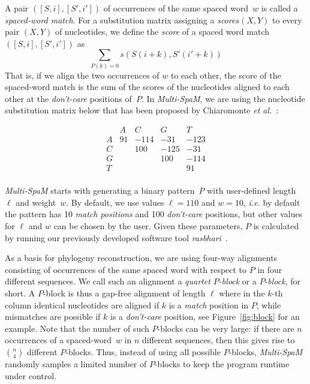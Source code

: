 \documentclass[review]{elsarticle}
\begin{document}
{A pair $\left([S,i],[S',i']\right)$ of occurrences of the same spaced word~$w$ is called a {\em spaced-word match}. For a substitution matrix assigning a {\em score}$s( X,Y)$ to every pair $(X,Y)$ of nucleotides, we define the {\em score} of a spaced word match $([S,i],[S',i'])$ as  
$$\sum_{P(k) = 0}  s( S(i+k),S'(i'+k))$$
That is, if we align the two occurrences of $w$ to each other, the score of the spaced-word match is the sum of the scores of the nucleotides aligned to each other at the {\em don't-care} positions of~$P$. In {\em Multi-SpaM}, we are using the  nucleotide substitution matrix below that has been proposed by
Chiaromonte {\em et al.}~\cite{chi:yap:mil:02}:

\[
\begin{array}{crrrr}
  & A  &   C  &  G  &   T  \\
A & 91 & -114 & -31 & -123 \\
C &    & 100  &-125 &  -31 \\
G &    &      & 100 & -114 \\
T &    &      &     &   91 \\
\end{array}
\]

{\em Multi-SpaM} starts with generating a binary pattern~$P$ with  user-defined length~$\ell$ and weight~$w$. By default, we use values $\ell=110$ and $w=10$, {\em i.e.} by default the pattern has 10 {\em match positions} and 100 {\em don't-care} positions, but other values for $\ell$ and $w$ can be chosen by the user. Given these parameters, $P$ is calculated by running our previously developed software tool {\em rasbhari}~\cite{hah:lei:oun:etal:16}.  

As a basis for phylogeny reconstruction, we are using four-way alignments consisting of occurrences of the same spaced word with respect to $P$ in four different sequences. We call such an alignment a {\em quartet $P$-block} or a $P$-{\em block}, for short. A $P$-block is thus a gap-free alignment of length $\ell$ where in the $k$-th column identical nucleotides are aligned if $k$ is a {\em  match} position in $P$, while mismatches are possible if $k$ is a {\em don't-care} position, see Figure~\ref{fig:block} for an example.   
%
%
%
Note that the number of such $P$-blocks can be very large: if there are $n$ occurrences of a spaced-word~$w$ in $n$ different sequences, then this gives rise to $n \choose 4$ different $P$-blocks. 
Thus, instead of using all possible $P$-blocks, {\em Multi-SpaM} randomly samples a limited number of $P$-blocks  to keep the program runtime under control.  

}
\end{document}
